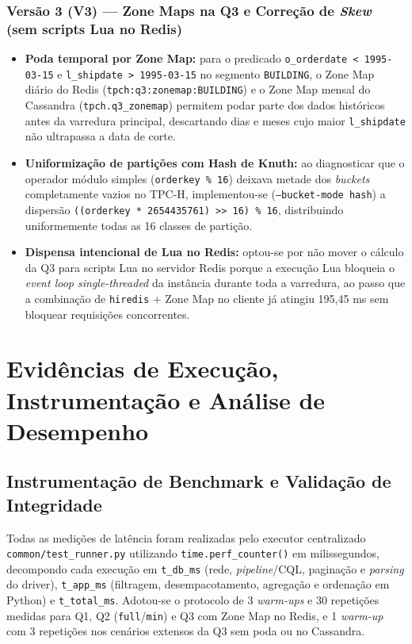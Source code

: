 \documentclass[12pt,a4paper]{article}
\begin{document}
\subsubsection*{Versão 3 (V3) --- Zone Maps na Q3 e Correção de \textit{Skew} (sem scripts Lua no Redis)}
\begin{itemize}
    \item \textbf{Poda temporal por Zone Map:} para o predicado \texttt{o\_orderdate < 1995-03-15} e \texttt{l\_shipdate > 1995-03-15} no segmento \texttt{BUILDING}, o Zone Map diário do Redis (\texttt{tpch:q3:zonemap:BUILDING}) e o Zone Map mensal do Cassandra (\texttt{tpch.q3\_zonemap}) permitem podar parte dos dados históricos antes da varredura principal, descartando dias e meses cujo maior \texttt{l\_shipdate} não ultrapassa a data de corte.
    \item \textbf{Uniformização de partições com Hash de Knuth:} ao diagnosticar que o operador módulo simples (\texttt{orderkey \% 16}) deixava metade dos \textit{buckets} completamente vazios no TPC-H, implementou-se (\texttt{--bucket-mode hash}) a dispersão \texttt{((orderkey * 2654435761) >> 16) \% 16}, distribuindo uniformemente todas as 16 classes de partição.
    \item \textbf{Dispensa intencional de Lua no Redis:} optou-se por não mover o cálculo da Q3 para scripts Lua no servidor Redis porque a execução Lua bloqueia o \textit{event loop single-threaded} da instância durante toda a varredura, ao passo que a combinação de \texttt{hiredis} + Zone Map no cliente já atingiu 195,45 ms sem bloquear requisições concorrentes.
\end{itemize}

\newpage

\section{Evidências de Execução, Instrumentação e Análise de Desempenho}

\subsection{Instrumentação de Benchmark e Validação de Integridade}
Todas as medições de latência foram realizadas pelo executor centralizado \texttt{common/test\_runner.py} utilizando \texttt{time.perf\_counter()} em milissegundos, decompondo cada execução em \texttt{t\_db\_ms} (rede, \textit{pipeline}/CQL, paginação e \textit{parsing} do driver), \texttt{t\_app\_ms} (filtragem, desempacotamento, agregação e ordenação em Python) e \texttt{t\_total\_ms}. Adotou-se o protocolo de 3 \textit{warm-ups} e 30 repetições medidas para Q1, Q2 (\texttt{full}/\texttt{min}) e Q3 com Zone Map no Redis, e 1 \textit{warm-up} com 3 repetições nos cenários extensos da Q3 sem poda ou no Cassandra.
\end{document}
